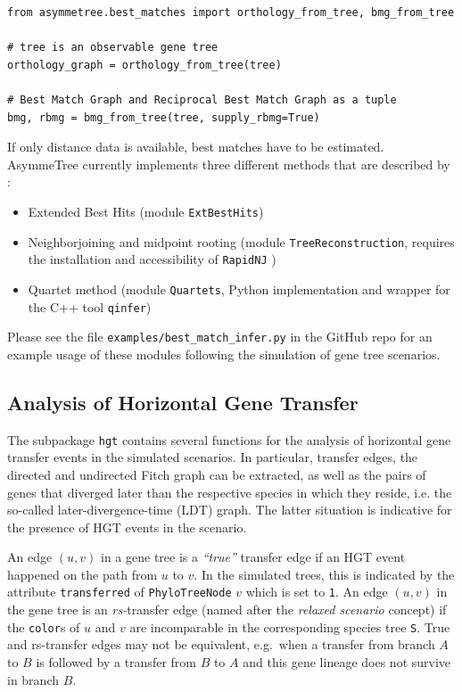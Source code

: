 \documentclass[hidelinks,11pt]{article}
\begin{document}
\begin{adjustwidth}{1cm}{1cm}\vspace{2mm}
\begin{verbatim}
from asymmetree.best_matches import orthology_from_tree, bmg_from_tree

# tree is an observable gene tree
orthology_graph = orthology_from_tree(tree)

# Best Match Graph and Reciprocal Best Match Graph as a tuple
bmg, rbmg = bmg_from_tree(tree, supply_rbmg=True)
\end{verbatim}
\end{adjustwidth}

\noindent
If only distance data is available, best matches have to be estimated.
AsymmeTree currently implements three different methods that are described by \citet{stadler2020}:
\begin{itemize}
	\item Extended Best Hits (module \texttt{ExtBestHits})
	\item Neighborjoining \cite{saitou1987} and midpoint rooting (module \texttt{TreeReconstruction}, requires the installation and accessibility of \texttt{RapidNJ} \citep{simonsen2008})
	\item Quartet method (module \texttt{Quartets}, Python implementation and wrapper for the C++ tool \texttt{qinfer})
\end{itemize}

Please see the file \texttt{examples/best\_match\_infer.py} in the GitHub repo for an example usage of these modules following the simulation of gene tree scenarios.


\subsection{Analysis of Horizontal Gene Transfer}

The subpackage \texttt{hgt} contains several functions for the analysis of 
horizontal gene transfer events in the simulated scenarios. In particular, 
transfer edges, the 
directed and undirected Fitch graph can be extracted, as well as the pairs 
of genes that diverged later than the respective species in which they reside, 
i.e. the so-called later-divergence-time (LDT) graph. The latter situation is 
indicative for the presence of HGT events in the scenario.

An edge $(u, v)$ in a gene tree is a \emph{``true''} transfer edge if an HGT 
event happened on the path from $u$ to $v$. In the simulated trees, this is 
indicated by the attribute \texttt{transferred} of \texttt{PhyloTreeNode} $v$ 
which is set to \texttt{1}.
An edge $(u, v)$ in the gene tree is an \emph{rs-}transfer edge (named after 
the \emph{relaxed scenario} concept) if the \texttt{color}s of $u$ and $v$ are 
incomparable in the corresponding species tree \texttt{S}.
True and rs-transfer edges may not be equivalent, e.g.\ when a transfer from 
branch $A$ to $B$ is followed by a transfer from $B$ to $A$ and this gene 
lineage does not survive in branch $B$.
\end{document}
